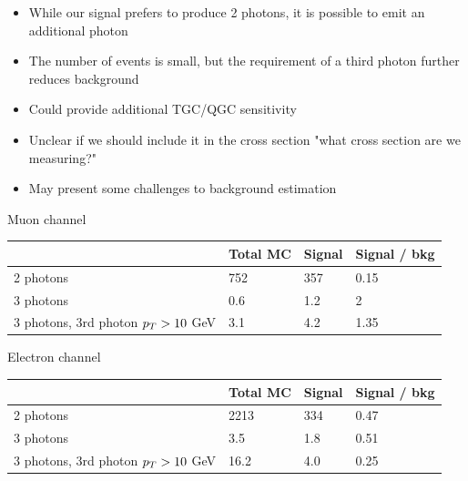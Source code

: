 \documentclass{beamer}
\begin{document}
 {

    \scriptsize

    \begin{itemize}
        \item While our signal prefers to produce 2 photons, it is possible to emit an additional photon
        \item The number of events is small, but the requirement of a third photon further reduces background
        \item Could provide additional TGC/QGC sensitivity
        \item Unclear if we should include it in the cross section "what cross section are we measuring?"
        \item May present some challenges to background estimation
    \end{itemize}

    Muon channel
    
    \begin{tabular}{ | l l l l |}\hline
     & Total MC & Signal & Signal / bkg \\ \hline
        2 photons  & 752 & 357 &  0.15  \\
        3 photons  & 0.6 & 1.2 &  2  \\
        3 photons, 3rd photon $p_{T} > 10$ GeV & 3.1 & 4.2 &  1.35  \\
    \end{tabular}

    Electron channel

    \begin{tabular}{ | l l l l |}\hline
     & Total MC & Signal & Signal / bkg \\ \hline
        2 photons  & 2213 & 334 & 0.47   \\
        3 photons  & 3.5 & 1.8 &  0.51  \\
        3 photons, 3rd photon $p_{T} > 10$ GeV & 16.2 & 4.0 & 0.25  \\
    \end{tabular}

}
\end{document}
